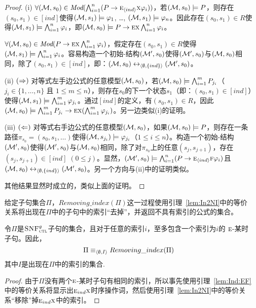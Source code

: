 \begin{proof}
	(i) $\forall ({\cal M}, s_0) \in \textit{Mod}(\bigwedge_{i=1}^n (P\rightarrow \textsc{e}_{{\langle{ind}\rangle}} \textsc{x} \varphi_i))$，若$({\cal M}, s_0) \models P$，则存在$(s_0, s_1)\in [ind]$使得$({\cal M}, s_1) \models \varphi_1$, \dots, $({\cal M}, s_1) \models \varphi_n$。因此存在$(s_0, s_1)\in R$使得$({\cal M}, s_1) \models \bigwedge_{i=1}^n \varphi_i$，即$({\cal M}, s_0) \models P\rightarrow \textsc{e} \textsc{x} \bigwedge_{i=1}^n \varphi_i$。
	
	$\forall ({\cal M}, s_0) \in \textit{Mod}(P\rightarrow \textsc{e} \textsc{x} \bigwedge_{i=1}^n \varphi_i)$，假定存在$(s_0, s_1)\in R$使得$({\cal M}, s_1) \models \bigwedge_{i=1}^n \varphi_i$。容易构造一个初始\Ind-结构$({\cal M}', s_0)$使得$({\cal M}', s_0)$与$({\cal M}, s_0)$相同，除了$(s_0, s_1) \in [ind]$，即：$({\cal M}, s_0) \leftrightarrow_{{\langle{\emptyset, \{ind\}}\rangle}} ({\cal M}', s_0)$。
	
	(ii) $(\Rightarrow)$ 对等式左手边公式的任意模型$({\cal M},s_0)$，若$({\cal M},s_0) \models \bigwedge_{i=1}^m P_{j_i}$（$j_i \in \{1, \dots, n\}$ 且 $1\leq m \leq n$），则存在$s_0$的下一个状态$s_1$（即：$(s_0, s_1) \in [ind]$）使得$({\cal M}, s_1) \models \bigwedge_{i=1}^m \varphi_{j_i}$。通过$[ind]$的定义，有$(s_0, s_1) \in R$，因此$({\cal M}, s_0) \models \bigwedge_{i=1}^m P_{j_i} \rightarrow \textsc{e} \textsc{x} (\bigwedge_{i=1}^m \varphi_{j_i})$。另一边类似(i)的证明。%
	
	(iii) $(\Leftarrow)$ 对等式右手边公式的任意模型$({\cal M},s_0)$，如果$({\cal M},s_0) \models P$，则存在一条路径$\pi_{s_0} = (s_0, s_1, \dots)$使得$ ({\cal M}, s_{j_i}) \models \varphi_{j_i}$（$1\leq i \leq n$）。构造一个初始\Ind-结构$({\cal M}', s_0)$使得$({\cal M}', s_0)$与$({\cal M}, s_0)$相同，除了对$\pi_{s_0}$上的任意$(s_j, s_{j+1})$，存在$(s_j, s_{j+1}) \in [ind]$ $(0\leq j)$。显然，$({\cal M}', s_0) \models \bigwedge_{i=1}^n (P\rightarrow \textsc{e}_{{\langle{ind}\rangle}} \textsc{f} \varphi_i)$且$({\cal M}, s_0) \leftrightarrow_{{\langle{\emptyset, \{ind\}}\rangle}} ({\cal M}', s_0)$。另一个方向与(ii)中的证明类似。
	
	其他结果显然时成立的，类似上面的证明。
\end{proof}

给定子句集合$\Pi$，$Removing\_index(\Pi)$这一过程使用引理~\ref{lem:In2NI}中的等价关系将出现在$\Pi$中的子句中的索引“去掉”，并返回不具有索引的公式的集合。
\begin{proposition}\label{lem:No:Ind}
	令$\Pi$是${\textsc{SNF}_{\textsc{ctl}}^g}$子句的集合，且对于任意的索引$i$，至多包含一个索引为$i$的
	$\textsc{e}$-某时子句。因此，$$\Pi\equiv_{{\langle{\emptyset, I}\rangle}}  Removing\_index(\Pi)$$
	其中$I$是出现在$\Pi$中的索引的集合.
\end{proposition}
\begin{proof}
	由于$\Pi$没有两个$\textsc{e}$-某时子句有相同的索引，所以事先使用引理~\ref{lem:Ind:EF}中的等价关系将显示出$\textsc{e}_{ind}\textsc{x}$时序操作词，然后使用引理~\ref{lem:In2NI}中的等价关系“移除”掉$\textsc{e}_{ind}\textsc{x}$中的索引。
\end{proof}

